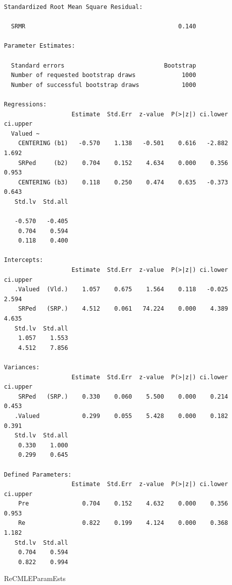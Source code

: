 \documentclass[
  11pt,
]{book}
\newenvironment{Shaded}{\begin{snugshade}}{\end{snugshade}}
\newcommand{\NormalTok}[1]{#1}
\begin{document}
\begin{verbatim}
Standardized Root Mean Square Residual:

  SRMR                                           0.140

Parameter Estimates:

  Standard errors                            Bootstrap
  Number of requested bootstrap draws             1000
  Number of successful bootstrap draws            1000

Regressions:
                   Estimate  Std.Err  z-value  P(>|z|) ci.lower ci.upper
  Valued ~                                                              
    CENTERING (b1)   -0.570    1.138   -0.501    0.616   -2.882    1.692
    SRPed     (b2)    0.704    0.152    4.634    0.000    0.356    0.953
    CENTERING (b3)    0.118    0.250    0.474    0.635   -0.373    0.643
   Std.lv  Std.all
                  
   -0.570   -0.405
    0.704    0.594
    0.118    0.400

Intercepts:
                   Estimate  Std.Err  z-value  P(>|z|) ci.lower ci.upper
   .Valued  (Vld.)    1.057    0.675    1.564    0.118   -0.025    2.594
    SRPed   (SRP.)    4.512    0.061   74.224    0.000    4.389    4.635
   Std.lv  Std.all
    1.057    1.553
    4.512    7.856

Variances:
                   Estimate  Std.Err  z-value  P(>|z|) ci.lower ci.upper
    SRPed   (SRP.)    0.330    0.060    5.500    0.000    0.214    0.453
   .Valued            0.299    0.055    5.428    0.000    0.182    0.391
   Std.lv  Std.all
    0.330    1.000
    0.299    0.645

Defined Parameters:
                   Estimate  Std.Err  z-value  P(>|z|) ci.lower ci.upper
    Pre               0.704    0.152    4.632    0.000    0.356    0.953
    Re                0.822    0.199    4.124    0.000    0.368    1.182
   Std.lv  Std.all
    0.704    0.594
    0.822    0.994
\end{verbatim}

\begin{Shaded}
\begin{Highlighting}[]
\NormalTok{ReCMLEParamEsts}
\end{Highlighting}
\end{Shaded}
\end{document}

